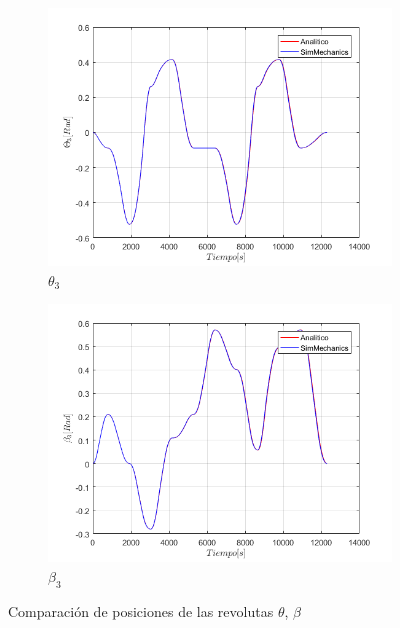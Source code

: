 \begin{figure}
\begin{subfigure}{0.45\textwidth}
        \includegraphics[width=\linewidth]{Cap4_DisenoBasico/Figura/ComparativoSimMechanics/Theta3.png}
        \caption{$\theta_3$}
    \end{subfigure}
    \begin{subfigure}{0.45\textwidth}
        \includegraphics[width=\linewidth]{Cap4_DisenoBasico/Figura/ComparativoSimMechanics/Beta3.png}
        \caption{$\beta_3$}
    \end{subfigure}
    \caption{Comparación de posiciones de las revolutas $\theta$, $\beta$}
\end{figure}


